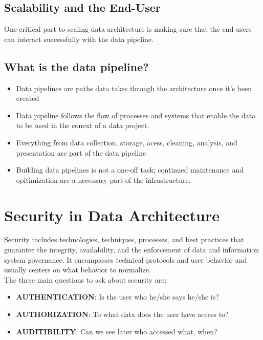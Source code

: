 \documentclass[12pt,a4paper]{article}
\begin{document}
\subsection{Scalability and the End-User}

One critical part to scaling data architecture is making sure that the end users can interact successfully with the data pipeline.

\subsection{What is the data pipeline?}

\begin{itemize}
	\item Data pipelines are paths data takes through the architecture once it's been created
	\item Data pipeline follows the flow of processes and systems that enable the data to be used in the conext of a data project.
	\item Everything from data collection, storage, acess, cleaning, analysis, and presentation are part of the data pipeline
	\item Building data pipelines is not a one-off task; continued maintenance and opitimization are a necessary part of the infrastructure.
\end{itemize}

\section{Security in Data Architecture}

Security includes technologies, techniques, processes, and best practices that guarantee the integrity, availability, and the enforcement of data and information system governance. It encompasses technical protocols and user behavior and usually centers on what behavior to normalize.
\\
The three main questions to ask about security are:

\begin{itemize}
	\item \textbf{AUTHENTICATION}: Is the user who he/she says he/she is?

	\item \textbf{AUTHORIZATION}: To what data does the user have access to?

	\item \textbf{AUDITIBILITY}: Can we see later who accessed what, when?
\end{itemize}
\end{document}
